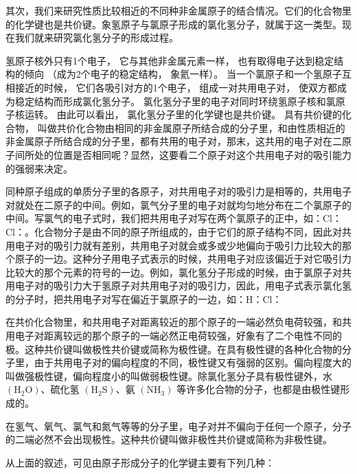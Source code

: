 其次，我们来研究性质比较相近的不同种非金属原子的结合情况。它们的化合物里的化学键也是共价键。象氢原子与氯原子形成的氯化氢分子，就属于这一类型。现在我们就来研究氯化氢分子的形成过程。

氢原子核外只有1个电子， 它与其他非金属元素一样，
也有取得电子达到稳定结构的倾向 （成为2个电子的稳定结构， 象氦一样）。
当一个氯原子和一个氢原子互相接近的时候， 它们各吸引对方的1个电子，
组成一对共用电子对， 使双方都成为稳定结构而形成氯化氢分子。
氯化氢分子里的电子对同时环绕氢原子核和氯原子核运转。 由此可以看出，
氯化氢分子里的化学键也是共价键。 具有共价键的化合物，
叫做共价化合物由相同的非金属原子所结合成的分子里，和由性质相近的非金属原子所结合成的分子里，都有共用的电子对，那末，这共用的电子对在二原子间所处的位置是否相同呢？显然，这要看二个原子对这个共用电子对的吸引能力的强弱来决定。

同种原子组成的单质分子里的各原子，对共用电子对的吸引力是相等的，共用电子对就处在二原子的中间。例如，氯气分子里的电子对就均匀地分布在二个氯原子的中间。写氯气的电子式时，我们把共用电子对写在两个氯原子的正中，如：Cl：Cl：。化合物分子是由不同的原子所组成的，由于它们的原子结构不同，因此对共用电子对的吸引力就有差别，共用电子对就会或多或少地偏向于吸引力比较大的那个原子的一边。这种分子用电子式表示的时候，共用电子对应该偏近于对它吸引力比较大的那个元素的符号的一边。例如，氯化氢分子形成的时候，由于氯原子对共用电子对的吸引力大于氢原子对共用电子对的吸引力，因此，用电子式表示氯化氢的分子时，把共用电子对写在偏近于氯原子的一边，如：H：Cl：

在共价化合物里，和共用电子对距离较近的那个原子的一端必然负电荷较强，和共用电子对距离较远的那个原子的一端必然正电荷较强，好象有了二个电性不同的极。这种共价键叫做极性共价键或简称为极性键。在具有极性键的各种化合物的分子里，由于共用电子对的偏向程度的不同，极性键又有强弱的区别。偏向程度大的叫做强极性键，偏向程度小的叫做弱极性键。除氯化氢分子具有极性键外，水
\(\left(\mathrm{H}_{2}\mathrm{O}\right)\)、硫化氢
\(\left(\mathrm{H}_{2}\mathrm{S}\right)\)、氨
\(\left(\mathrm{NH}_{3}\right)\)
等许多化合物的分子，也都是由极性键形成的。

在氢气、氧气、氯气和氮气等等的分子里，电子对并不偏向于任何一个原子，分子的二端必然不会出现极性。这种共价键叫做非极性共价键或简称为非极性键。

从上面的叙述，可见由原子形成分子的化学键主要有下列几种：


